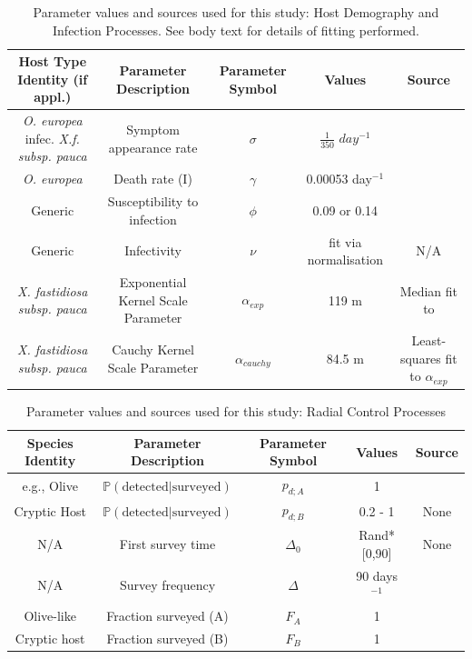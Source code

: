 \documentclass[prstpaper]{revtex4-2}
\begin{document}
\begin{table}
\centering
\begin{adjustbox}{width=\textwidth}
\small
    \begin{tabular}{|c|c|c|c|c|}
    \hline
         \textbf{Host Type Identity (if appl.)}  & \textbf{Parameter Description} & \textbf{Parameter Symbol} & \textbf{Values} & \textbf{Source}\\
         \hline
        \hline
         \emph{O. europea} infec. \emph{X.f. subsp. pauca} & Symptom appearance rate & $\sigma$& $\frac{1}{350}$ $day^{-1}$ &  \cite{Bragard2019}\\
        \hline
         \emph{O. europea} & Death rate (I) & $\gamma$  & 0.00053 day$^{-1}$&  \cite{Bragard2019} \\
        \hline
        Generic & Susceptibility to infection& $\phi$& 0.09 or 0.14 & \cite{HyattTwynham2017}\\
        \hline
        Generic & Infectivity & $\nu$ & fit via normalisation & N/A \\
        \hline
        \emph{X. fastidiosa subsp. pauca}& Exponential Kernel Scale Parameter & $\alpha_{exp}$ & 119 m & Median fit to \cite{Bodino2021}\\
        \hline
        \emph{X. fastidiosa subsp. pauca}& Cauchy Kernel Scale Parameter & $\alpha_{cauchy}$ & 84.5 m & Least-squares fit to $\alpha_{exp}$ \\
        \hline
    \end{tabular}
    \end{adjustbox}
    \caption{Parameter values and sources used for this study: Host Demography and Infection Processes. See body text for details of fitting performed.}
    \label{tab:my_label}
\end{table}



\begin{table}
    \centering
    \begin{tabular}{|c|c|c|c|c|}
    \hline
        \textbf{Species Identity}  & \textbf{Parameter Description} & \textbf{Parameter Symbol} & \textbf{Values} & \textbf{Source} \\
        \hline \hline
        e.g., Olive & $\mathbb{P} \mathrm{(detected | surveyed)}$& $p_{d;A}$& 1 & \cite{Bragard2019} \\   
        \hline
         Cryptic Host & $\mathbb{P} \mathrm{(detected | surveyed)}$& $p_{d;B}$& 0.2 - 1& None\\        
        \hline
         N/A & First survey time & $\Delta_{0}$& Rand*[0,90] & None\\
        \hline
        N/A & Survey frequency & $\Delta$ & 90 days$^{-1}$&  \cite{HyattTwynham2017}\\
        \hline
         Olive-like & Fraction surveyed (A)  & $F_{A}$ & 1 &  \cite{HyattTwynham2017}\\
        \hline
         Cryptic host & Fraction surveyed (B) & $F_{B}$ & 1 & \cite{HyattTwynham2017}\\
        \hline
    \end{tabular}
    \caption{Parameter values and sources used for this study: Radial Control Processes}
    \label{tab:my_label}
\end{table}
\end{document}
